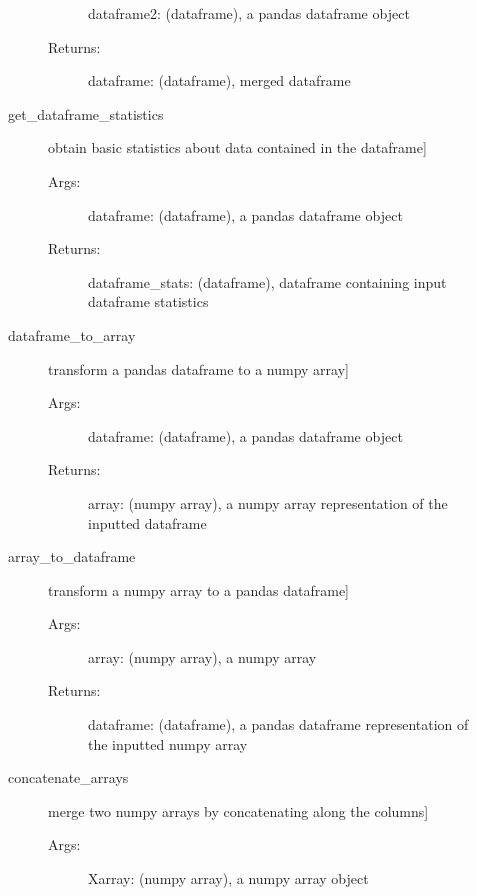\documentclass[letterpaper,10pt,english]{sphinxmanual}
\begin{document}
\begin{fulllineitems}
\begin{description}
\begin{description}
\begin{description}
dataframe2: (dataframe), a pandas dataframe object

\item[{Returns:}] \leavevmode
dataframe: (dataframe), merged dataframe

\end{description}

\item[{get\_dataframe\_statistics}] \leavevmode{[}obtain basic statistics about data contained in the dataframe{]}\begin{description}
\item[{Args:}] \leavevmode
dataframe: (dataframe), a pandas dataframe object

\item[{Returns:}] \leavevmode
dataframe\_stats: (dataframe), dataframe containing input dataframe statistics

\end{description}

\item[{dataframe\_to\_array}] \leavevmode{[}transform a pandas dataframe to a numpy array{]}\begin{description}
\item[{Args:}] \leavevmode
dataframe: (dataframe), a pandas dataframe object

\item[{Returns:}] \leavevmode
array: (numpy array), a numpy array representation of the inputted dataframe

\end{description}

\item[{array\_to\_dataframe}] \leavevmode{[}transform a numpy array to a pandas dataframe{]}\begin{description}
\item[{Args:}] \leavevmode
array: (numpy array), a numpy array

\item[{Returns:}] \leavevmode
dataframe: (dataframe), a pandas dataframe representation of the inputted numpy array

\end{description}

\item[{concatenate\_arrays}] \leavevmode{[}merge two numpy arrays by concatenating along the columns{]}\begin{description}
\item[{Args:}] \leavevmode
Xarray: (numpy array), a numpy array object


\end{description}
\end{description}
\end{description}
\end{fulllineitems}
\end{document}
